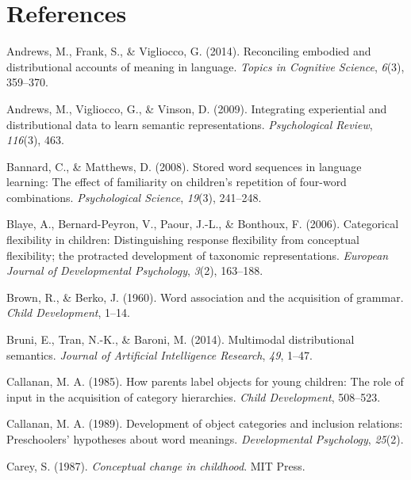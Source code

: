 \documentclass[english,,man]{apa6}
\begin{document}
\hypertarget{references}{%
\section{References}\label{references}}

\setlength{\parindent}{-0.5in}
\setlength{\leftskip}{0.5in}

\hypertarget{refs}{}
\leavevmode\hypertarget{ref-andrews2014}{}%
Andrews, M., Frank, S., \& Vigliocco, G. (2014). Reconciling embodied and distributional accounts of meaning in language. \emph{Topics in Cognitive Science}, \emph{6}(3), 359--370.

\leavevmode\hypertarget{ref-andrews2009integrating}{}%
Andrews, M., Vigliocco, G., \& Vinson, D. (2009). Integrating experiential and distributional data to learn semantic representations. \emph{Psychological Review}, \emph{116}(3), 463.

\leavevmode\hypertarget{ref-bannard2008}{}%
Bannard, C., \& Matthews, D. (2008). Stored word sequences in language learning: The effect of familiarity on children's repetition of four-word combinations. \emph{Psychological Science}, \emph{19}(3), 241--248.

\leavevmode\hypertarget{ref-blaye2006categorical}{}%
Blaye, A., Bernard-Peyron, V., Paour, J.-L., \& Bonthoux, F. (2006). Categorical flexibility in children: Distinguishing response flexibility from conceptual flexibility; the protracted development of taxonomic representations. \emph{European Journal of Developmental Psychology}, \emph{3}(2), 163--188.

\leavevmode\hypertarget{ref-brown1960word}{}%
Brown, R., \& Berko, J. (1960). Word association and the acquisition of grammar. \emph{Child Development}, 1--14.

\leavevmode\hypertarget{ref-bruni2014}{}%
Bruni, E., Tran, N.-K., \& Baroni, M. (2014). Multimodal distributional semantics. \emph{Journal of Artificial Intelligence Research}, \emph{49}, 1--47.

\leavevmode\hypertarget{ref-callanan1985}{}%
Callanan, M. A. (1985). How parents label objects for young children: The role of input in the acquisition of category hierarchies. \emph{Child Development}, 508--523.

\leavevmode\hypertarget{ref-callanan1989}{}%
Callanan, M. A. (1989). Development of object categories and inclusion relations: Preschoolers' hypotheses about word meanings. \emph{Developmental Psychology}, \emph{25}(2).

\leavevmode\hypertarget{ref-carey1987}{}%
Carey, S. (1987). \emph{Conceptual change in childhood}. MIT Press.
\end{document}
